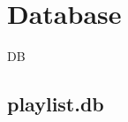 \documentclass[12pt]{report} %
\begin{document}

\newpage

\section{Database}

\hspace{1cm}DB

\subsection{playlist.db}
\end{document}

